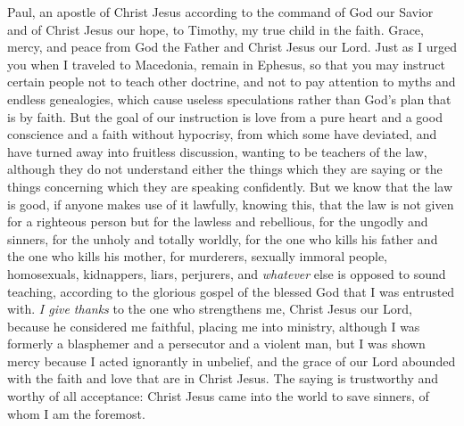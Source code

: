 
\begin{biblechapter} %
 Paul, an apostle of Christ Jesus according to the command of God our Savior and of Christ Jesus our hope,
\verse to Timothy, my true child in the faith. Grace, mercy, and peace from God the Father and Christ Jesus our Lord.
 Just as I urged you when I traveled to Macedonia, remain in Ephesus, so that you may instruct certain people not to teach other doctrine,
\verse and not to pay attention to myths and endless genealogies, which cause useless speculations rather than God’s plan that is by faith.
\verse But the goal of our instruction is love from a pure heart and a good conscience and a faith without hypocrisy,
\verse from which some have deviated, and have turned away into fruitless discussion,
\verse wanting to be teachers of the law, although they do not understand either the things which they are saying or the things concerning which they are speaking confidently.
\verse But we know that the law is good, if anyone makes use of it lawfully,
\verse knowing this, that the law is not given for a righteous person but for the lawless and rebellious, for the ungodly and sinners, for the unholy and totally worldly, for the one who kills his father and the one who kills his mother, for murderers,
\verse sexually immoral people, homosexuals, kidnappers, liars, perjurers, and \textit{whatever} else is opposed to sound teaching,
\verse according to the glorious gospel of the blessed God that I was entrusted with.
 \textit{I give thanks} to the one who strengthens me, Christ Jesus our Lord, because he considered me faithful, placing me into ministry,
\verse although I was formerly a blasphemer and a persecutor and a violent man, but I was shown mercy because I acted ignorantly in unbelief,
\verse and the grace of our Lord abounded with the faith and love that are in Christ Jesus.
\verse The saying is trustworthy and worthy of all acceptance: Christ Jesus came into the world to save sinners, of whom I am the foremost.

\end{biblechapter}
